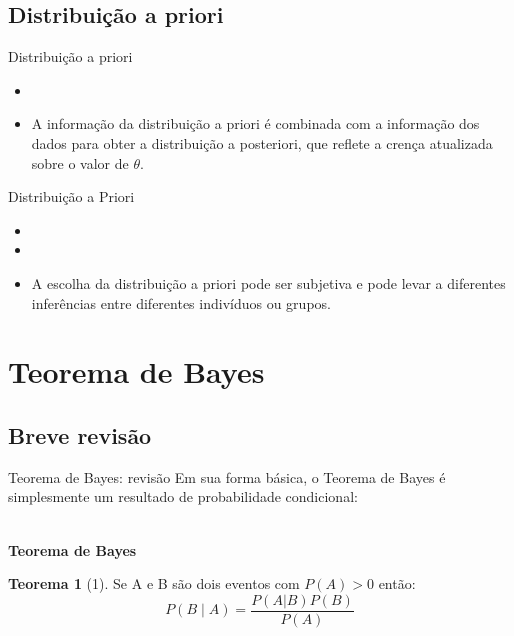 \documentclass{beamer}
\theoremstyle{definition}
\newtheorem{thm}{Teorema}[section]
\begin{document}
\subsection{Distribuição a priori}
\begin{frame}{Distribuição a priori}
\begin{itemize}
\item {}
\vspace{0.2cm}
\item A informação da distribuição a priori é combinada com a informação dos dados para obter a distribuição a posteriori, que reflete a crença atualizada sobre o valor de $\theta$.
\end{itemize}
\end{frame}
\begin{frame}{Distribuição a Priori}
\begin{itemize}
\item {}
\vspace{0.2cm}
\item {}
\vspace{0.2cm}
\item A escolha da distribuição a priori pode ser subjetiva e pode levar a diferentes inferências entre diferentes indivíduos ou grupos.
\end{itemize}
    
\end{frame}

\section{Teorema de Bayes}
\subsection{Breve revisão}
\begin{frame}{Teorema de Bayes: revisão}
Em sua forma básica, o Teorema de Bayes é simplesmente um resultado de probabilidade
condicional:\\
\

\textbf{Teorema de Bayes}
\begin{thm}[1]
    Se A e B são dois eventos com $P(A)>0$ então:
    $$P(B \mid A)=\frac{P(A|B)P(B)}{P(A)}$$
\end{thm}
\end{frame}
\end{document}
